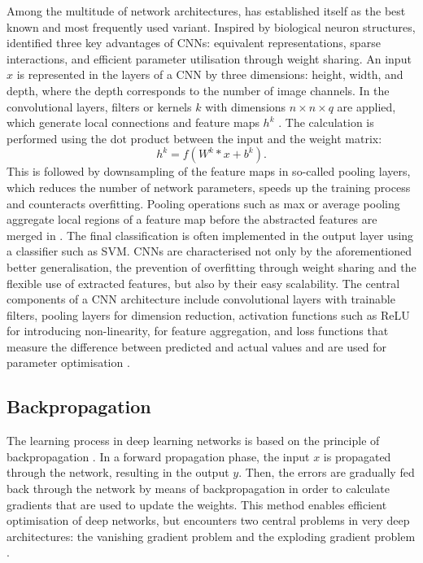 Among the multitude of network architectures,  has established itself as the best known and most frequently used variant. Inspired by biological neuron structures, \citeauthor{Goodfellow-et-al-2016} identified three key advantages of CNNs: equivalent representations, sparse interactions, and efficient parameter utilisation through weight sharing. An input $x$ is represented in the layers of a CNN by three dimensions: height, width, and depth, where the depth corresponds to the number of image channels. In the convolutional layers, filters or kernels $k$ with dimensions $n \times n \times q$ are applied, which generate local connections and feature maps $h^k$ \cite{Alzubaidi2021}. The calculation is performed using the dot product between the input and the weight matrix:  
\begin {equation}
h^k = f(W^k \ast x + b^k).
\end {equation}
This is followed by downsampling of the feature maps in so-called pooling layers, which reduces the number of network parameters, speeds up the training process and counteracts overfitting. Pooling operations such as max or average pooling aggregate local regions of a feature map before the abstracted features are merged in . The final classification is often implemented in the output layer using a classifier such as \acrfull{SVM}. CNNs are characterised not only by the aforementioned better generalisation, the prevention of overfitting through weight sharing and the flexible use of extracted features, but also by their easy scalability. The central components of a \acrshort{CNN} architecture include convolutional layers with trainable filters, pooling layers for dimension reduction, activation functions such as \acrfull{ReLU} for introducing non-linearity,  for feature aggregation, and loss functions that measure the difference between predicted and actual values and are used for parameter optimisation \cite{Alzubaidi2021}.

\subsection{Backpropagation}

The learning process in deep learning networks is based on the principle of backpropagation \cite{Goodfellow-et-al-2016}. In a forward propagation phase, the input $x$ is propagated through the network, resulting in the output $y$. Then, the errors are gradually fed back through the network by means of backpropagation in order to calculate gradients that are used to update the weights. This method enables efficient optimisation of deep networks, but encounters two central problems in very deep architectures: the vanishing gradient problem and the exploding gradient problem \cite{Alzubaidi2021}.  

